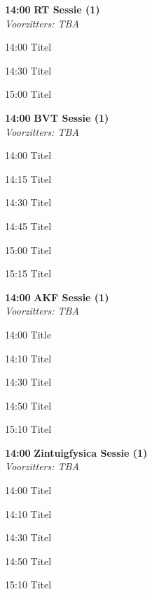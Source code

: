 \documentclass[a4paper,10pt]{report}
\begin{document}
\begin{multicols*}{3}
\begin{packed_enum}
\item[\textbf{14:00}] \textbf{RT Sessie (1)}\\\textit{Voorzitters: TBA}
\item[14:00] Titel 
\item[14:30] Titel 
\item[15:00] Titel 
\end{packed_enum} %

\vfill 

\begin{packed_enum}
\item[\textbf{14:00}]\textbf{BVT Sessie (1)}\\\textit{Voorzitters: TBA}
\item[14:00] Titel 
\item[14:15] Titel 
\item[14:30] Titel 
\item[14:45] Titel 
\item[15:00] Titel 
\item[15:15] Titel 
\end{packed_enum} %
 
\vfill

\begin{packed_enum}
\item[\textbf{14:00}] \textbf{AKF Sessie (1)}\\\textit{Voorzitters: TBA}
\item[14:00] Title 
\item[14:10] Titel 
\item[14:30] Titel 
\item[14:50] Titel 
\item[15:10] Titel 
\end{packed_enum} %

\vfill

\begin{packed_enum}
\item[\textbf{14:00}] \textbf{Zintuigfysica Sessie (1)}\\\textit{Voorzitters: TBA}
\item[14:00] Titel 
\item[14:10] Titel 
\item[14:30] Titel 
\item[14:50] Titel 
\item[15:10] Titel 
\end{packed_enum} %


\end{multicols*}
\end{document}
